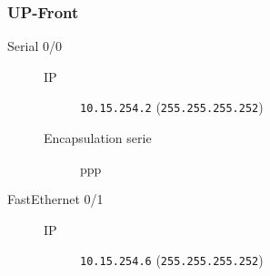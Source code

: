 \subsubsection{UP-Front}

	\begin{description}
		\item[Serial 0/0] 
		\begin{description}
			\item[IP] \texttt{10.15.254.2} (\texttt{255.255.255.252})
			\item[Encapsulation serie] ppp
		\end{description}

		\item[FastEthernet 0/1] 
		\begin{description}
			\item[IP] \texttt{10.15.254.6} (\texttt{255.255.255.252})
		\end{description}

	\end{description}
	
	\clearpage
